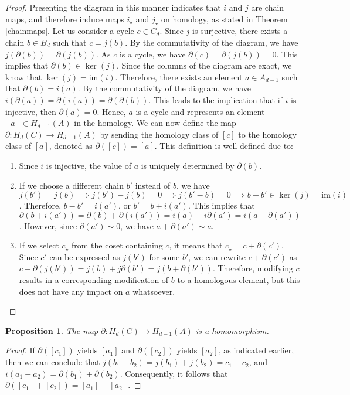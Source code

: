 \documentclass{amsart}
\newtheorem{proposition}[definition]{Proposition}
\begin{document}
\begin{proof}
Presenting the diagram in this manner indicates that $i$ and $j$ are chain maps, and therefore induce maps $i_\star$ and $j_\star$ on homology, as stated in Theorem \ref{chainmaps}. Let us consider a cycle $c \in C_d$. Since $j$ is surjective, there exists a chain $b \in B_d$ such that $c = j(b)$. By the commutativity of the diagram, we have $j(\partial(b)) = \partial(j(b))$. As $c$ is a cycle, we have $\partial(c) = \partial(j(b)) = 0$. This implies that $\partial(b) \in \ker(j)$. Since the columns of the diagram are exact, we know that $\ker(j) = \text{im}(i)$. Therefore, there exists an element $a \in A_{d-1}$ such that $\partial(b) = i(a)$. By the commutativity of the diagram, we have $i(\partial(a)) = \partial(i(a)) = \partial(\partial(b))$. This leads to the implication that if $i$ is injective, then $\partial(a) = 0$. Hence, $a$ is a cycle and represents an element $[a] \in H_{d-1}(A)$ in the homology. We can now define the map $\partial: H_d(C) \rightarrow H_{d-1}(A)$ by sending the homology class of $[c]$ to the homology class of $[a]$, denoted as $\partial([c]) = [a]$. This definition is well-defined due to:
\begin{enumerate}
	\item Since $i$ is injective, the value of $a$ is uniquely determined by $\partial(b)$.
	\item If we choose a different chain $b'$ instead of $b$, we have $j(b') = j(b) \implies j(b')-j(b) = 0 \implies j(b'-b) = 0 \implies b-b' \in \ker(j) = \text{im}(i)$. Therefore, $b-b' = i(a')$, or $b' = b+i(a')$. This implies that $\partial(b+i(a')) = \partial(b) + \partial(i(a')) = i(a) + i \partial(a') = i(a + \partial(a'))$. However, since $\partial(a') \sim 0$, we have $a+\partial(a') \sim a$.
	\item If we select $c_\star$ from the coset containing $c$, it means that $c_\star = c + \partial(c')$. Since $c'$ can be expressed as $j(b')$ for some $b'$, we can rewrite $c+\partial(c')$ as $c+\partial(j(b')) = j(b) + j\partial(b') = j(b+\partial(b'))$. Therefore, modifying $c$ results in a corresponding modification of $b$ to a homologous element, but this does not have any impact on $a$ whatsoever.
\end{enumerate}
\end{proof}

\begin{proposition}
The map $\partial: H_d(C) \rightarrow H_{d-1}(A)$ is a homomorphism.
\end{proposition}

\begin{proof}
If $\partial([c_1])$ yields $[a_1]$ and $\partial([c_2])$ yields $[a_2]$, as indicated earlier, then we can conclude that $j(b_1 + b_2) = j(b_1) + j(b_2) = c_1 + c_2$, and $i(a_1 + a_2) = \partial(b_1) + \partial(b_2)$. Consequently, it follows that $\partial([c_1] + [c_2]) = [a_1] + [a_2]$.
\end{proof}
\end{document}
